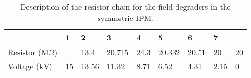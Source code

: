 \begin{table}[ht]
	\centering
	\caption[Description of the resistor chain for the field degraders in the symmetric IPM]
	{Description of the resistor chain for the field degraders in the symmetric IPM.}
	\label{chap3:resistor_sym}
	\begin{tabular}{lllllllll}
		\toprule
		                                & 1  & 2     & 3      & 4    & 5      & 6     & 7    &    \\
		\midrule
		Resistor (\(\mathrm{M}\Omega\)) &    & 13.4  & 20.715 & 24.3 & 20.332 & 20.51 & 20   & 20 \\
		Voltage (\(\mathrm{kV}\))       & 15 & 13.56 & 11.32  & 8.71 & 6.52   & 4.31  & 2.15 & 0  \\
		\bottomrule
	\end{tabular}
\end{table}